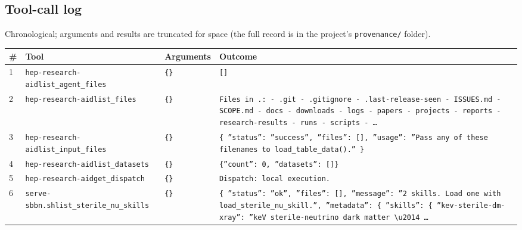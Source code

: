 \documentclass[11pt,a4paper]{article}
\begin{document}
\subsection{Tool-call log}
Chronological; arguments and results are truncated for space (the full record is in the project's \texttt{provenance/} folder).
\begin{longtable}{@{}p{}p{}p{}p{}@{}}
\toprule \# & Tool & Arguments & Outcome \\ \midrule \endhead
1 & \texttt{hep-research-aid}\newline\texttt{list\_\allowbreak{}agent\_\allowbreak{}files} & \texttt{\{\}\allowbreak{}} & \texttt{[]\allowbreak{}} \\
2 & \texttt{hep-research-aid}\newline\texttt{list\_\allowbreak{}files} & \texttt{\{\}\allowbreak{}} & \texttt{Files in .:\allowbreak{}   - .git   - .gitignore   - .last-release-seen   - ISSUES.md   - SCOPE.md   - docs   - downloads   - logs   - papers   - projects   - reports   - research-results   - runs   - scripts   - \ldots{}\allowbreak{}} \\
3 & \texttt{hep-research-aid}\newline\texttt{list\_\allowbreak{}input\_\allowbreak{}files} & \texttt{\{\}\allowbreak{}} & \texttt{\{   ''status'':\allowbreak{} ''success'',\allowbreak{}   ''files'':\allowbreak{} []\allowbreak{},\allowbreak{}   ''usage'':\allowbreak{} ''Pass any of these filenames to load\_\allowbreak{}table\_\allowbreak{}data()\allowbreak{}.'' \}\allowbreak{}} \\
4 & \texttt{hep-research-aid}\newline\texttt{list\_\allowbreak{}datasets} & \texttt{\{\}\allowbreak{}} & \texttt{\{''count'':\allowbreak{} 0,\allowbreak{} ''datasets'':\allowbreak{} []\allowbreak{}\}\allowbreak{}} \\
5 & \texttt{hep-research-aid}\newline\texttt{get\_\allowbreak{}dispatch} & \texttt{\{\}\allowbreak{}} & \texttt{Dispatch:\allowbreak{} local execution.} \\
6 & \texttt{serve-sbbn.sh}\newline\texttt{list\_\allowbreak{}sterile\_\allowbreak{}nu\_\allowbreak{}skills} & \texttt{\{\}\allowbreak{}} & \texttt{\{   ''status'':\allowbreak{} ''ok'',\allowbreak{}   ''files'':\allowbreak{} []\allowbreak{},\allowbreak{}   ''message'':\allowbreak{} ''2 skills. Load one with load\_\allowbreak{}sterile\_\allowbreak{}nu\_\allowbreak{}skill.'',\allowbreak{}   ''metadata'':\allowbreak{} \{     ''skills'':\allowbreak{} \{       ''kev-sterile-dm-xray'':\allowbreak{} ''keV sterile-neutrino dark matter \textbackslash{}\allowbreak{}u2014 \ldots{}\allowbreak{}} \\

\end{longtable}
\end{document}
